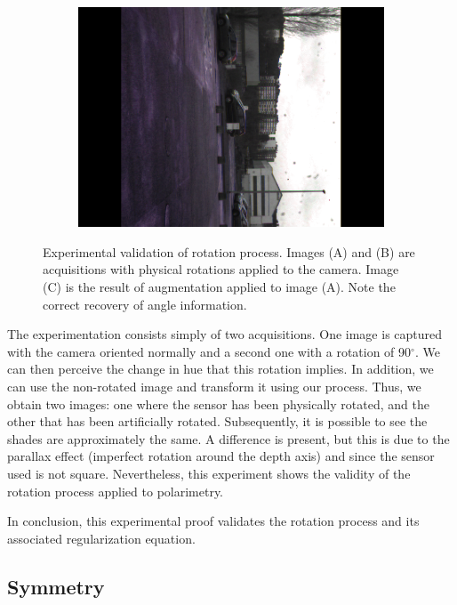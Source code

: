 \begin{figure}[h]
\begin{subfigure}[b]{0.3\linewidth}
		\includegraphics[width=\linewidth]{Figures/Aug/exprimentalTest/augmented.png}
	\end{subfigure}
	\caption[Experimental validation of rotation process.]{Experimental validation of rotation process.  Images (A) and (B) are acquisitions with physical rotations applied to the camera. Image (C) is the result of augmentation applied to image (A). Note the correct recovery of angle information.
	}\label{proofexper}
\end{figure}

The experimentation consists simply of two acquisitions. One image is captured with the camera oriented normally and a second one with a rotation of 90$^\circ$. We can then perceive the change in hue that this rotation implies. In addition, we can use the non-rotated image and transform it using our process. Thus, we obtain two images: one where the sensor has been physically rotated, and the other that has been artificially rotated.
Subsequently, it is possible to see the shades are approximately the same. A difference is present, but this is due to the parallax effect (imperfect rotation around the depth axis) and since the sensor used is not square. Nevertheless, this experiment shows the validity of the rotation process applied to polarimetry.

In conclusion, this experimental proof validates the rotation process and its associated regularization equation.



\subsection{Symmetry}\label{syn}

